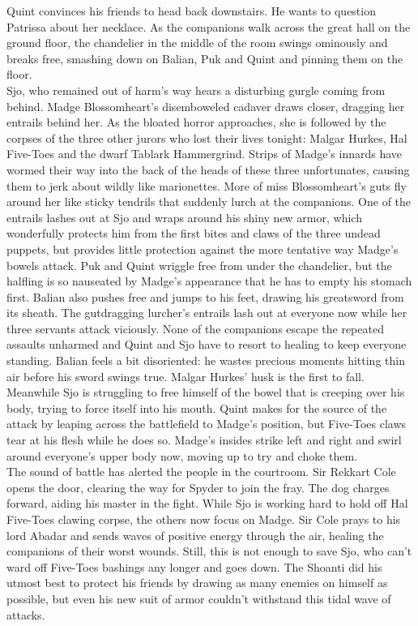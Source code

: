 Quint convinces his friends to head back downstairs. He wants to question Patrissa about her necklace. As the companions walk across the great hall on the ground floor, the chandelier in the middle of the room swings ominously and breaks free, smashing down on Balian, Puk and Quint and pinning them on the floor.\\

Sjo, who remained out of harm's way hears a disturbing gurgle coming from behind. Madge Blossomheart's disemboweled cadaver draws closer, dragging her entrails behind her. As the bloated horror approaches, she is followed by the corpses of the three other jurors who lost their lives tonight: Malgar Hurkes, Hal Five-Toes and the dwarf Tablark Hammergrind. Strips of Madge's innards have wormed their way into the back of the heads of these three unfortunates, causing them to jerk about wildly like marionettes. More of miss Blossomheart's guts fly around her like sticky tendrils that suddenly lurch at the companions. One of the entrails lashes out at Sjo and wraps around his shiny new armor, which wonderfully protects him from the first bites and claws of the three undead puppets, but provides little protection against the more tentative way Madge's bowels attack. Puk and Quint wriggle free from under the chandelier, but the halfling is so nauseated by Madge's appearance that he has to empty his stomach first. Balian also pushes free and jumps to his feet, drawing his greatsword from its sheath. The gutdragging lurcher's entrails lash out at everyone now while her three servants attack viciously. None of the companions escape the repeated assaults unharmed and Quint and Sjo have to resort to healing to keep everyone standing. Balian feels a bit disoriented: he wastes precious moments hitting thin air before his sword swings true. Malgar Hurkes' husk is the first to fall. Meanwhile Sjo is struggling to free himself of the bowel that is creeping over his body, trying to force itself into his mouth. Quint makes for the source of the attack by leaping across the battlefield to Madge's position, but Five-Toes claws tear at his flesh while he does so. Madge's insides strike left and right and swirl around everyone's upper body now, moving up to try and choke them.\\

The sound of battle has alerted the people in the courtroom. Sir Rekkart Cole opens the door, clearing the way for Spyder to join the fray. The dog charges forward, aiding his master in the fight. While Sjo is working hard to hold off Hal Five-Toes clawing corpse, the others now focus on Madge. Sir Cole prays to his lord Abadar and sends waves of positive energy through the air, healing the companions of their worst wounds. Still, this is not enough to save Sjo, who can't ward off Five-Toes bashings any longer and goes down. The Shoanti did his utmost best to protect his friends by drawing as many enemies on himself as possible, but even his new suit of armor couldn't withstand this tidal wave of attacks.\\

